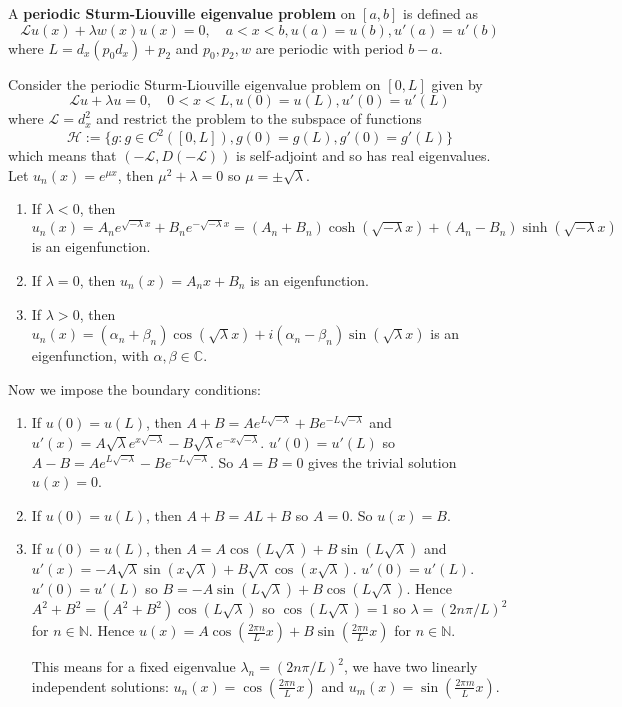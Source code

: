 \begin{definition}
	A \textbf{periodic Sturm-Liouville eigenvalue problem} on $[a, b]$ is defined as
	\[
		\mathcal{L} u(x) + \lambda w(x) u(x) = 0, \quad a < x < b, u(a) = u(b), u'(a) = u'(b)
	\]
	where $L = d_x (p_0 d_x) + p_2$ and $p_0, p_2, w$ are periodic with period $b - a$.
\end{definition}

\begin{example}
	Consider the periodic Sturm-Liouville eigenvalue problem on $[0, L]$ given by
	\[
		\mathcal{L} u + \lambda u = 0, \quad 0 < x < L, u(0) = u(L), u'(0) = u'(L)
	\]
	where $\mathcal{L} = d_x^2$ and restrict the problem to the subspace of functions
	\[
		\mathcal{H} := \{ g: g \in C^2 ([0, L]), g(0) = g(L), g'(0) = g'(L) \}
	\]
	which means that $(-\mathcal{L}, D(-\mathcal{L}))$ is self-adjoint and so has real eigenvalues. Let $u_n(x) = e^{\mu x}$, then $\mu^2 + \lambda = 0$ so $\mu = \pm\sqrt{\lambda}$.
	\begin{enumerate}
		\item If $\lambda < 0$, then $u_n(x) = A_n e^{\sqrt{-\lambda} x} + B_n e^{-\sqrt{-\lambda} x} = (A_n + B_n) \cosh(\sqrt{-\lambda} x) + (A_n - B_n) \sinh(\sqrt{-\lambda} x)$ is an eigenfunction.
		\item If $\lambda = 0$, then $u_n(x) = A_n x + B_n$ is an eigenfunction.
		\item If $\lambda > 0$, then $u_n(x) = (\alpha_n + \beta_n) \cos(\sqrt{\lambda} x) + i (\alpha_n - \beta_n) \sin(\sqrt{\lambda} x)$ is an eigenfunction, with $\alpha, \beta \in \mathbb{C}$.
	\end{enumerate}
	Now we impose the boundary conditions:
	\begin{enumerate}
		\item If $u(0) = u(L)$, then $A + B = A e^{L \sqrt{-\lambda}} + B e^{-L \sqrt{-\lambda}}$ and $u'(x) = A \sqrt{\lambda} e^{x \sqrt{-\lambda}} - B \sqrt{\lambda} e^{-x \sqrt{-\lambda}}$. $u'(0) = u'(L)$ so $A - B = Ae^{L \sqrt{-\lambda}} - Be^{-L \sqrt{-\lambda}}$. So $A = B = 0$ gives the trivial solution $u(x) = 0$.
		\item If $u(0) = u(L)$, then $A + B = AL + B$ so $A = 0$. So $u(x) = B$.
		\item If $u(0) = u(L)$, then $A = A \cos(L \sqrt{\lambda}) + B \sin(L \sqrt{\lambda})$ and $u'(x) = -A \sqrt{\lambda} \sin(x \sqrt{\lambda}) + B \sqrt{\lambda} \cos(x \sqrt{\lambda})$. $u'(0) = u'(L)$. $u'(0) = u'(L)$ so $B = -A \sin(L \sqrt{\lambda}) + B \cos(L \sqrt{\lambda})$. Hence $A^2 + B^2 = (A^2 + B^2) \cos(L \sqrt{\lambda})$ so $\cos(L \sqrt{\lambda}) = 1$ so $\lambda = {(2 n \pi / L)}^2$ for $n \in \mathbb{N}$. Hence $u(x) = A \cos(\frac{2 \pi n}{L} x) + B \sin(\frac{2 \pi n}{L} x)$ for $n \in \mathbb{N}$.
		
		This means for a fixed eigenvalue $\lambda_n = {(2 n \pi / L)}^2$, we have two linearly independent solutions: $u_n(x) = \cos(\frac{2 \pi n}{L} x)$ and $u_m(x) = \sin(\frac{2 \pi m}{L} x)$.
	\end{enumerate}
\end{example}

